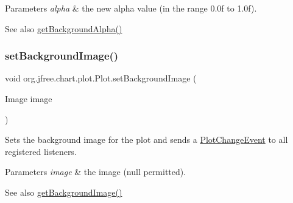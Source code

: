 \begin{DoxyParams}{Parameters}
{\em alpha} & the new alpha value (in the range 0.\+0f to 1.\+0f).\\
\hline
\end{DoxyParams}
\begin{DoxySeeAlso}{See also}
\mbox{\hyperlink{classorg_1_1jfree_1_1chart_1_1plot_1_1_plot_ad9d25c2b8b15314bf48b6bbb8be98bc0}{get\+Background\+Alpha()}} 
\end{DoxySeeAlso}
\mbox{\label{classorg_1_1jfree_1_1chart_1_1plot_1_1_plot_a93449bff646ac0c3a63c0657842a2e70}} 
\subsubsection{\texorpdfstring{set\+Background\+Image()}{setBackgroundImage()}}
{\footnotesize\ttfamily void org.\+jfree.\+chart.\+plot.\+Plot.\+set\+Background\+Image (\begin{DoxyParamCaption}\item[{Image}]{image }\end{DoxyParamCaption})}

Sets the background image for the plot and sends a \mbox{\hyperlink{}{Plot\+Change\+Event}} to all registered listeners.


\begin{DoxyParams}{Parameters}
{\em image} & the image ({\ttfamily null} permitted).\\
\hline
\end{DoxyParams}
\begin{DoxySeeAlso}{See also}
\mbox{\hyperlink{classorg_1_1jfree_1_1chart_1_1plot_1_1_plot_a22e81fa28885106c5cdc5d6411305c76}{get\+Background\+Image()}} 
\end{DoxySeeAlso}
\mbox{\label{classorg_1_1jfree_1_1chart_1_1plot_1_1_plot_aa2e7bd23e9c5e6785519e74335ff3af0}} 
